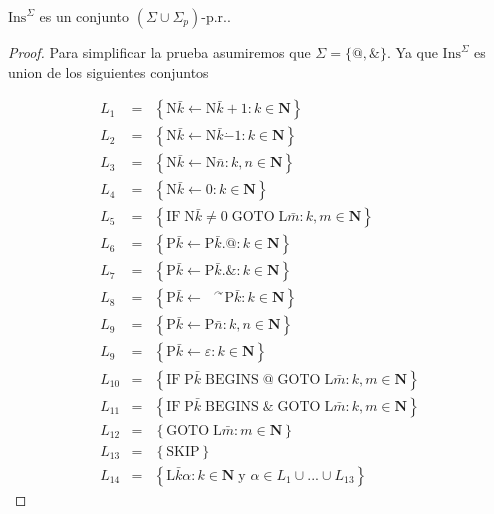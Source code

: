   \begin{lemma}
    \(\mathrm{Ins}^{\Sigma }\) es un conjunto \((\Sigma \cup \Sigma _{p})\)-p.r..
  \begin{proof}
    Para simplificar la prueba asumiremos que \(\Sigma =\{@,\& \}\). Ya que \( \mathrm{Ins}^{\Sigma }\) es union de los
    siguientes conjuntos

    \[
      \displaystyle \begin{array}{rcl} L_{1} & =& \left\{ \mathrm{N}\bar{k}\leftarrow \mathrm{N}\bar{k}+1:k\in
      \mathbf{N}\right\} \\ L_{2} & =& \left\{ \mathrm{N}\bar{k}\leftarrow \mathrm{N}\bar{k}\dot{-}1:k\in
      \mathbf{N}\right\} \\ L_{3} & =& \left\{ \mathrm{N}\bar{k}\leftarrow \mathrm{N}\bar{n}:k,n\in \mathbf{N}\right\} \\
      L_{4} & =& \left\{ \mathrm{N}\bar{k}\leftarrow 0:k\in \mathbf{N}\right\} \\ L_{5} & =& \left\{ \mathrm{IF}\;
      \mathrm{N}\bar{k}\neq 0\;\mathrm{GOTO}\; \mathrm{L}\bar{m}:k,m\in \mathbf{N}\right\} \\ L_{6} & =& \left\{
      \mathrm{P}\bar{k}\leftarrow \mathrm{P}\bar{k}.@:k\in \mathbf{N}\right\} \\ L_{7} & =& \left\{ \mathrm{P}\bar{k}
      \leftarrow \mathrm{P}\bar{k}.\& :k\in \mathbf{N}\right\} \\ L_{8} & =& \left\{ \mathrm{P}\bar{k}\leftarrow \text{ }
      ^{\curvearrowright } \mathrm{P}\bar{k}:k\in \mathbf{N}\right\} \\ L_{9} & =& \left\{ \mathrm{P}\bar{k}\leftarrow
      \mathrm{P}\bar{n}:k,n\in \mathbf{N}\right\} \\ L_{9} & =& \left\{ \mathrm{P}\bar{k}\leftarrow \varepsilon :k\in
      \mathbf{N} \right\} \\ L_{10} & =& \left\{ \mathrm{IF}\;\mathrm{P}\bar{k}\;\mathrm{BEGINS}\;@\; \mathrm{GOTO}\;
      \mathrm{L}\bar{m}:k,m\in \mathbf{N}\right\} \\ L_{11} & =& \left\{ \mathrm{IF}\;\mathrm{P}\bar{k}\;\mathrm{BEGINS}
      \;\& \; \mathrm{GOTO}\;\mathrm{L}\bar{m}:k,m\in \mathbf{N}\right\} \\ L_{12} & =& \left\{ \mathrm{GOTO}\;\mathrm{L}
      \bar{m}:m\in \mathbf{N}\right\} \\ L_{13} & =& \left\{ \mathrm{SKIP}\right\} \\ L_{14} & =& \left\{ \mathrm{L}
      \bar{k}\alpha :k\in \mathbf{N\;}\text{y }\alpha \in L_{1}\cup ...\cup L_{13}\right\} \end{array}
    \]


\end{proof}
\end{lemma}
